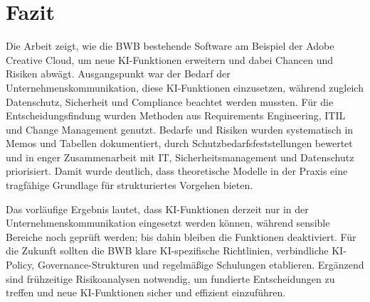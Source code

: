 \documentclass[
    12pt, 
    a4paper,
    ]{scrartcl} %
\begin{document}
\section{Fazit}
Die Arbeit zeigt, wie die BWB bestehende Software am Beispiel der Adobe Creative Cloud, um neue KI-Funktionen erweitern und dabei Chancen und Risiken abwägt. Ausgangspunkt war der Bedarf der Unternehmenskommunikation, diese KI-Funktionen einzusetzen, während zugleich Datenschutz, Sicherheit und Compliance beachtet werden mussten. Für die Entscheidungsfindung wurden Methoden aus Requirements Engineering, ITIL und Change Management genutzt. Bedarfe und Risiken wurden systematisch in Memos und Tabellen dokumentiert, durch Schutzbedarfsfeststellungen bewertet und in enger Zusammenarbeit mit IT, Sicherheitsmanagement und Datenschutz priorisiert. Damit wurde deutlich, dass theoretische Modelle in der Praxis eine tragfähige Grundlage für strukturiertes Vorgehen bieten.

Das vorläufige Ergebnis lautet, dass KI-Funktionen derzeit nur in der Unternehmenskommunikation eingesetzt werden können, während sensible Bereiche noch geprüft werden; bis dahin bleiben die Funktionen deaktiviert. Für die Zukunft sollten die BWB klare KI-spezifische Richtlinien, verbindliche KI-Policy, Governance-Strukturen und regelmäßige Schulungen etablieren. Ergänzend sind frühzeitige Risikoanalysen notwendig, um fundierte Entscheidungen zu treffen und neue KI-Funktionen sicher und effizient einzuführen.

\clearpage
{}
{}
\end{document}
